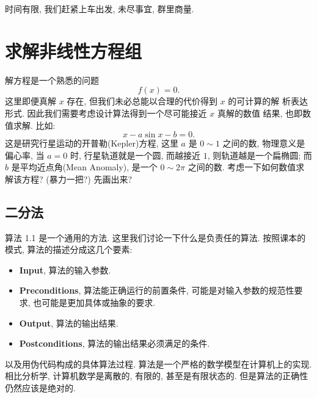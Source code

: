 \documentclass[a4paper]{ctexart}
\newcommand{\remark}[1]
{\noindent {\bf Remark {#1}}}
\begin{document}
时间有限, 我们赶紧上车出发, 未尽事宜, 群里商量.


\section{求解非线性方程组}
\label{sec::sne}

\remark{1.1} 解方程是一个熟悉的问题
\begin{equation}
  f(x) = 0.
  \label{eq::ge}
\end{equation}
这里即便真解 $x$ 存在, 但我们未必总能以合理的代价得到 $x$ 的可计算的解
析表达形式. 因此我们需要考虑设计算法得到一个尽可能接近 $x$ 真解的数值
结果, 也即数值求解. 比如:
\begin{equation}
  x - a \sin x - b = 0.
  \label{eq::Kepler}
\end{equation}
这是研究行星运动的开普勒(Kepler)方程, 这里 $a$ 是 $0 \sim 1$ 之间的数, 物理意义是偏心率, 
当 $a = 0$ 时, 行星轨道就是一个圆, 而越接近 $1$, 则轨道越是一个扁椭圆; 而 $b$ 是平均近点角(Mean Anomaly), 
是一个 $0 \sim 2 \pi$ 之间的数. 考虑一下如何数值求解该方程?
(暴力一把?) 先画出来?

\subsection{二分法}
算法 1.1 是一个通用的方法. 这里我们讨论一下什么是负责任的算法. 按照课本的模式, 
算法的描述分成这几个要素:
\begin{itemize}
  \item {\bf Input}, 算法的输入参数.
  \item {\bf Preconditions}, 算法能正确运行的前置条件, 可能是对输入参数的规范性要求, 也可能是更加具体或抽象的要求. 
  \item {\bf Output}, 算法的输出结果.
  \item {\bf Postconditions}, 算法的输出结果必须满足的条件.
\end{itemize}
以及用伪代码构成的具体算法过程. 算法是一个严格的数学模型在计算机上的实现. 
相比分析学, 计算机数学是离散的, 有限的, 甚至是有限状态的. 
但是算法的正确性仍然应该是绝对的.
\end{document}
